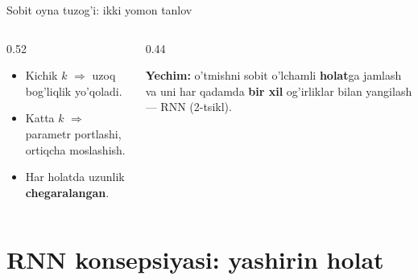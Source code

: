\documentclass[aspectratio=169,11pt]{beamer}
\begin{document}
\begin{frame}{Sobit oyna tuzog'i: ikki yomon tanlov}
  \begin{columns}[T]
    \begin{column}{0.52\textwidth}
      \begin{tcolorbox}[warnbox,title=Murosa]
        \small
        \begin{itemize}\setlength\itemsep{2pt}
          \item Kichik $k$ $\Rightarrow$ uzoq bog'liqlik yo'qoladi.
          \item Katta $k$ $\Rightarrow$ parametr portlashi, ortiqcha moslashish.
          \item Har holatda uzunlik \textbf{chegaralangan}.
        \end{itemize}
      \end{tcolorbox}
    \end{column}
    \begin{column}{0.44\textwidth}
      \begin{tcolorbox}[okbox,top=2pt,bottom=2pt]
        \footnotesize
        \textbf{Yechim:} o'tmishni sobit o'lchamli \textbf{holat}ga jamlash va
        uni har qadamda \textbf{bir xil} og'irliklar bilan yangilash --- RNN
        (2-tsikl).
      \end{tcolorbox}
    \end{column}
  \end{columns}
\end{frame}

\section[RNN]{RNN konsepsiyasi: yashirin holat}
\end{document}
